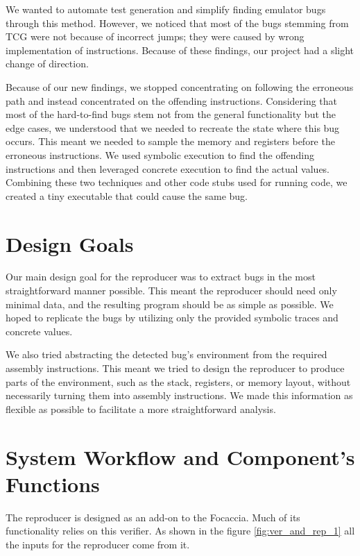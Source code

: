 We wanted to automate test generation and simplify finding emulator bugs through this method.
However, we noticed that most of the bugs stemming from \ac{TCG} were not because of incorrect jumps; they were caused by wrong implementation of instructions.
Because of these findings, our project had a slight change of direction.

Because of our new findings, we stopped concentrating on following the erroneous path and instead concentrated on the offending instructions.
Considering that most of the hard-to-find bugs stem not from the general functionality but the edge cases, we understood that we needed to recreate the state where this bug occurs.
This meant we needed to sample the memory and registers before the erroneous instructions.
We used symbolic execution to find the offending instructions and then leveraged concrete execution to find the actual values.
Combining these two techniques and other code stubs used for running code, we created a tiny executable that could cause the same bug.

\section{Design Goals}
Our main design goal for the reproducer was to extract bugs in the most straightforward manner possible.
This meant the reproducer should need only minimal data, and the resulting program should be as simple as possible.
We hoped to replicate the bugs by utilizing only the provided symbolic traces and concrete values.

We also tried abstracting the detected bug's environment from the required assembly instructions.
This meant we tried to design the reproducer to produce parts of the environment, such as the stack, registers, or memory layout, without necessarily turning them into assembly instructions.
We made this information as flexible as possible to facilitate a more straightforward analysis.

\section{System Workflow and Component's Functions}
The reproducer is designed as an add-on to the Focaccia.
Much of its functionality relies on this verifier.
As shown in the figure \ref{fig:ver_and_rep_1} all the inputs for the reproducer come from it.

